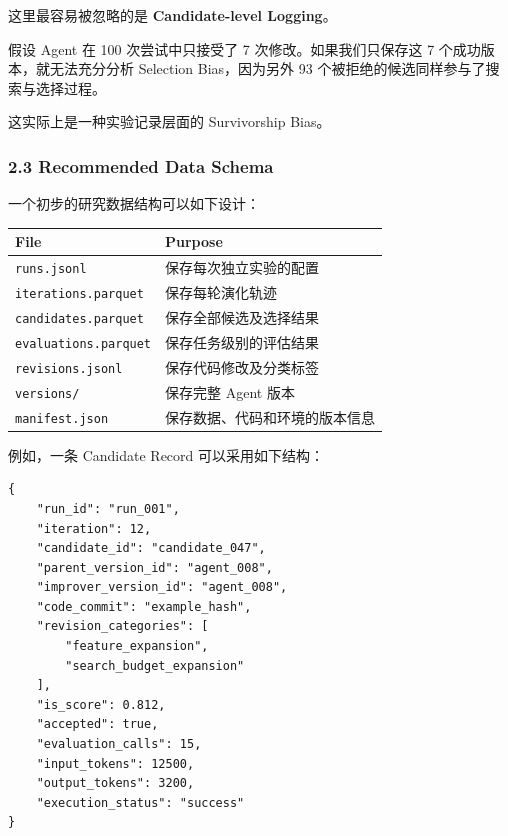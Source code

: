 这里最容易被忽略的是 \textbf{Candidate-level Logging}。

假设 Agent 在 100 次尝试中只接受了 7 次修改。如果我们只保存这 7 个成功版本，就无法充分分析 Selection Bias，因为另外 93 个被拒绝的候选同样参与了搜索与选择过程。

这实际上是一种实验记录层面的 Survivorship Bias。

\hypertarget{part-3-48-0001-recommended-data-schema}{%
\subsubsection{2.3 Recommended Data Schema}\label{part-3-48-0001-recommended-data-schema}}

一个初步的研究数据结构可以如下设计：

\begin{readertable}
\begin{longtable}[]{@{}
  >{\raggedright\arraybackslash}p{}
  >{\raggedright\arraybackslash}p{}@{}}
\toprule
File & Purpose \\
\midrule
\endhead
\texttt{runs.jsonl} & 保存每次独立实验的配置 \\
\texttt{iterations.parquet} & 保存每轮演化轨迹 \\
\texttt{candidates.parquet} & 保存全部候选及选择结果 \\
\texttt{evaluations.parquet} & 保存任务级别的评估结果 \\
\texttt{revisions.jsonl} & 保存代码修改及分类标签 \\
\texttt{versions/} & 保存完整 Agent 版本 \\
\texttt{manifest.json} & 保存数据、代码和环境的版本信息 \\
\bottomrule
\end{longtable}
\end{readertable}

例如，一条 Candidate Record 可以采用如下结构：

\begin{verbatim}
{
    "run_id": "run_001",
    "iteration": 12,
    "candidate_id": "candidate_047",
    "parent_version_id": "agent_008",
    "improver_version_id": "agent_008",
    "code_commit": "example_hash",
    "revision_categories": [
        "feature_expansion",
        "search_budget_expansion"
    ],
    "is_score": 0.812,
    "accepted": true,
    "evaluation_calls": 15,
    "input_tokens": 12500,
    "output_tokens": 3200,
    "execution_status": "success"
}
\end{verbatim}

